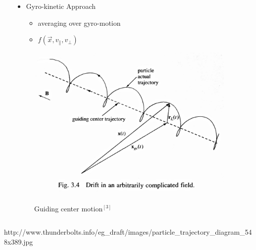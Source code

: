 \documentclass{beamer}
\begin{document}
\begin{frame}
\begin{columns}[onlytextwidth]
\begin{column}{0.5\textwidth}
	\end{column}
	\begin{column}{0.5\textwidth}
		\begin{center}
\begin{itemize}
			\item Gyro-kinetic Approach
				\begin{itemize}
				\item averaging over gyro-motion
				\item $f(\vec{x},v_\parallel, v_\perp)$
			\end{itemize}
			\end{itemize}
		\end{center}
						\begin{center}
		\begin{figure}
		\vspace{-0.3cm}
					\includegraphics[trim={0 2cm 0cm 0cm},clip,width=0.95\textwidth]{FIGURES/guiding_center.jpg}\\
					\begin{footnotesize}
					Guiding center motion$^{[3]}$
					\end{footnotesize}
				
\end{figure}
		\end{center}
	\end{column}
\end{columns}
\vspace{0.2cm}
\begin{tiny}
[3] http://www.thunderbolts.info/eg\_draft/images/particle\_trajectory\_diagram\_548x389.jpg
\end{tiny}
 \end{frame}
\end{document}
